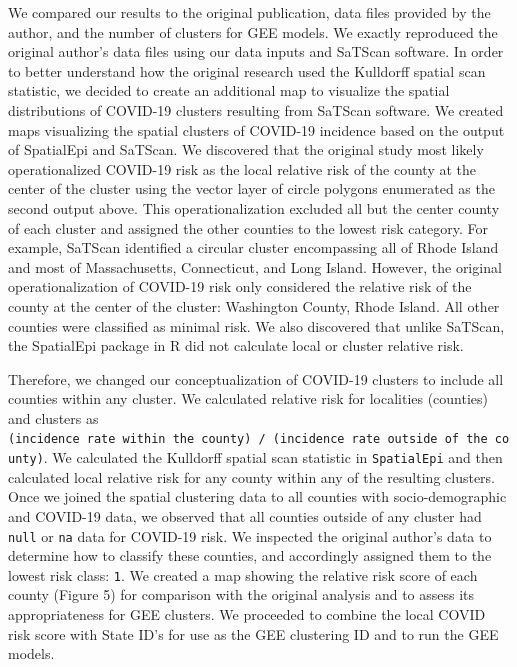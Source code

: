 \documentclass[
]{article}
\begin{document}
We compared our results to the original publication, data files provided
by the author, and the number of clusters for GEE models. We exactly
reproduced the original author's data files using our data inputs and
SaTScan software. In order to better understand how the original
research used the Kulldorff spatial scan statistic, we decided to create
an additional map to visualize the spatial distributions of COVID-19
clusters resulting from SaTScan software. We created maps visualizing
the spatial clusters of COVID-19 incidence based on the output of
SpatialEpi and SaTScan. We discovered that the original study most
likely operationalized COVID-19 risk as the local relative risk of the
county at the center of the cluster using the vector layer of circle
polygons enumerated as the second output above. This operationalization
excluded all but the center county of each cluster and assigned the
other counties to the lowest risk category. For example, SaTScan
identified a circular cluster encompassing all of Rhode Island and most
of Massachusetts, Connecticut, and Long Island. However, the original
operationalization of COVID-19 risk only considered the relative risk of
the county at the center of the cluster: Washington County, Rhode
Island. All other counties were classified as minimal risk. We also
discovered that unlike SaTScan, the SpatialEpi package in R did not
calculate local or cluster relative risk.

Therefore, we changed our conceptualization of COVID-19 clusters to
include all counties within any cluster. We calculated relative risk for
localities (counties) and clusters as
\texttt{(incidence\ rate\ within\ the\ county)\ /\ (incidence\ rate\ outside\ of\ the\ county)}.
We calculated the Kulldorff spatial scan statistic in
\texttt{SpatialEpi} and then calculated local relative risk for any
county within any of the resulting clusters. Once we joined the spatial
clustering data to all counties with socio-demographic and COVID-19
data, we observed that all counties outside of any cluster had
\texttt{null} or \texttt{na} data for COVID-19 risk. We inspected the
original author's data to determine how to classify these counties, and
accordingly assigned them to the lowest risk class: \texttt{1}. We
created a map showing the relative risk score of each county (Figure 5)
for comparison with the original analysis and to assess its
appropriateness for GEE clusters. We proceeded to combine the local
COVID risk score with State ID's for use as the GEE clustering ID and to
run the GEE models.
\end{document}
